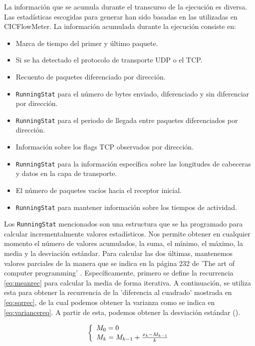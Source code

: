 \documentclass[10pt,a4paper,twoside]{article}
\begin{document}
\begin{multicols}{2}

    La información que se acumula durante el transcurso de la ejecución es diversa. Las estadísticas escogidas para generar han sido basadas en las utilizadas en CICFlowMeter. La información acumulada durante la ejecución consiste en:

    \begin{itemize}
        \item Marca de tiempo del primer y último paquete.
        \item Si se ha detectado el protocolo de transporte UDP o el TCP.
        \item Recuento de paquetes diferenciado por dirección.
        \item \texttt{RunningStat} para el número de bytes enviado, diferenciado y sin diferenciar por dirección.
        \item \texttt{RunningStat} para el periodo de llegada entre paquetes diferenciados por dirección.
        \item Información sobre los flags TCP observados por dirección.
        \item \texttt{RunningStat} para la información específica sobre las longitudes de cabeceras y datos en la capa de transporte.
        \item El número de paquetes vacíos hacia el receptor inicial.
        \item \texttt{RunningStat} para mantener información sobre los tiempos de actividad.
    \end{itemize}

    Los \texttt{RunningStat} mencionados son una estructura que se ha programado para calcular incrementalmente valores estadísticos. Nos permite obtener en cualquier momento el número de valores acumulados, la suma, el mínimo, el máximo, la media y la desviación estándar. Para calcular las dos últimas, mantenemos valores parciales de la manera que se indica en la página 232 de 'The art of computer programming' \cite{10.5555/270146}. Específicamente, primero se define la recurrencia \ref{eq:meanrec} para calcular la media de forma iterativa. A continuación, se utiliza esta para obtener la recurrencia de la 'diferencia al cuadrado' mostrada en \ref{eq:sqrrec}, de la cual podemos obtener la varianza como se indica en \ref{eq:variancereq}. A partir de esta, podemos obtener la desviación estándar (\sigma).

    \begin{equation} \label{eq:meanrec}
        \biggl\{
            \begin{array}{l}
              M_{0} = 0\\
              M_{k} = M_{k-1} + {{ x_{k} - M_{k-1} } \over {k}}  \\
            \end{array} 
    \end{equation}
    

\end{multicols}
\end{document}
